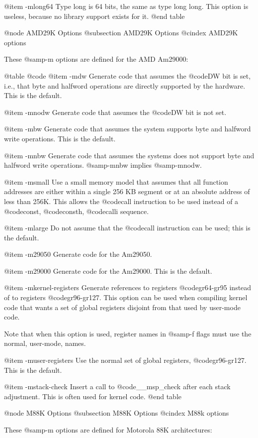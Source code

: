 {{@item -mlong64
Type long is 64 bits, the same as type long long.  This option is useless,
because no library support exists for it.
@end table

@node AMD29K Options
@subsection AMD29K Options
@cindex AMD29K options

These @samp{-m} options are defined for the AMD Am29000:

@table @code
@item -mdw
Generate code that assumes the @code{DW} bit is set, i.e., that byte and
halfword operations are directly supported by the hardware.  This is the
default.

@item -mnodw
Generate code that assumes the @code{DW} bit is not set.

@item -mbw
Generate code that assumes the system supports byte and halfword write
operations.  This is the default.

@item -mnbw
Generate code that assumes the systems does not support byte and
halfword write operations.  @samp{-mnbw} implies @samp{-mnodw}.

@item -msmall
Use a small memory model that assumes that all function addresses are
either within a single 256 KB segment or at an absolute address of less
than 256K.  This allows the @code{call} instruction to be used instead
of a @code{const}, @code{consth}, @code{calli} sequence.

@item -mlarge
Do not assume that the @code{call} instruction can be used; this is the
default.

@item -m29050
Generate code for the Am29050.

@item -m29000
Generate code for the Am29000.  This is the default.

@item -mkernel-registers
Generate references to registers @code{gr64-gr95} instead of to
registers @code{gr96-gr127}.  This option can be used when compiling
kernel code that wants a set of global registers disjoint from that used
by user-mode code.

Note that when this option is used, register names in @samp{-f} flags
must use the normal, user-mode, names.

@item -muser-registers
Use the normal set of global registers, @code{gr96-gr127}.  This is the
default.

@item -mstack-check
Insert a call to @code{__msp_check} after each stack adjustment.  This
is often used for kernel code.
@end table

@node M88K Options
@subsection M88K Options
@cindex M88k options

These @samp{-m} options are defined for Motorola 88K architectures:

}}
